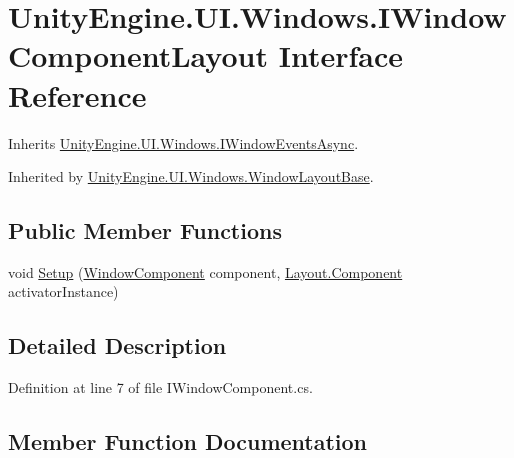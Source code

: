 \hypertarget{interface_unity_engine_1_1_u_i_1_1_windows_1_1_i_window_component_layout}{}\section{Unity\+Engine.\+U\+I.\+Windows.\+I\+Window\+Component\+Layout Interface Reference}
\label{interface_unity_engine_1_1_u_i_1_1_windows_1_1_i_window_component_layout}


Inherits \hyperlink{interface_unity_engine_1_1_u_i_1_1_windows_1_1_i_window_events_async}{Unity\+Engine.\+U\+I.\+Windows.\+I\+Window\+Events\+Async}.



Inherited by \hyperlink{class_unity_engine_1_1_u_i_1_1_windows_1_1_window_layout_base}{Unity\+Engine.\+U\+I.\+Windows.\+Window\+Layout\+Base}.

\subsection*{Public Member Functions}
\begin{DoxyCompactItemize}
\item 
void \hyperlink{interface_unity_engine_1_1_u_i_1_1_windows_1_1_i_window_component_layout_a4cdf7d9201081b063228a76b949e627a}{Setup} (\hyperlink{class_unity_engine_1_1_u_i_1_1_windows_1_1_window_component}{Window\+Component} component, \hyperlink{class_unity_engine_1_1_u_i_1_1_windows_1_1_types_1_1_layout_1_1_component}{Layout.\+Component} activator\+Instance)
\end{DoxyCompactItemize}


\subsection{Detailed Description}


Definition at line 7 of file I\+Window\+Component.\+cs.



\subsection{Member Function Documentation}
\hypertarget{interface_unity_engine_1_1_u_i_1_1_windows_1_1_i_window_component_layout_a4cdf7d9201081b063228a76b949e627a}{}
